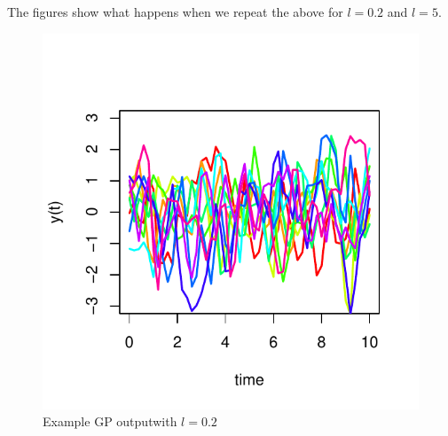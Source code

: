 \documentclass[a4paper,11pt]{article}\usepackage[]{graphicx}\usepackage[]{color}
\makeatletter
\def\maxwidth{ %
  \ifdim\Gin@nat@width>\linewidth
    \linewidth
  \else
    \Gin@nat@width
  \fi
}
\newenvironment{knitrout}{}{} %
\makeatother
\begin{document}
The figures show what happens when we repeat the above for $l=0.2$ and  $l=5$. 

\begin{knitrout}
\color{fgcolor}\begin{figure}

{\centering \includegraphics[width=\maxwidth]{figure/unnamed-chunk-20-1} 

}

\caption[Example GP outputwith ]{Example GP outputwith $l=0.2$}\label{fig:unnamed-chunk-20}
\end{figure}


\end{knitrout}
\end{document}
